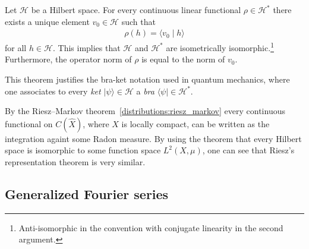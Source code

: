     \begin{theorem}\label{functional:riesz}
        Let $\mathcal{H}$ be a Hilbert space. For every continuous linear functional $\rho\in\mathcal{H}^*$ there exists a unique element $v_0\in\mathcal{H}$ such that
        \begin{gather}
            \rho(h) = \langle v_0\mid h\rangle
        \end{gather}
        for all $h\in\mathcal{H}$. This implies that $\mathcal{H}$ and $\mathcal{H}^*$ are isometrically isomorphic.\footnote{Anti-isomorphic in the convention with conjugate linearity in the second argument.} Furthermore, the operator norm of $\rho$ is equal to the norm of $v_0$.
    \end{theorem}
    \begin{remark}
        This theorem justifies the bra-ket notation used in quantum mechanics, where one associates to every \textit{ket} $\lvert\psi\rangle\in\mathcal{H}$ a \textit{bra} $\langle\psi\rvert\in\mathcal{H}^*$.
    \end{remark}

    \begin{remark}
        By the Riesz--Markov theorem~\ref{distributions:riesz_markov} every continuous functional on $C(\widehat{X})$, where $X$ is locally compact, can be written as the integration againt some Radon measure. By using the theorem that every Hilbert space is isomorphic to some function space $L^2(X,\mu)$, one can see that Riesz's representation theorem is very similar.
    \end{remark}

\subsection{Generalized Fourier series}

